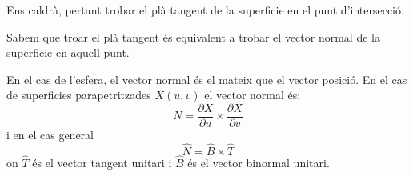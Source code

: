 \documentclass{article}
\begin{document}
Ens caldrà, pertant trobar el plà tangent de la superficie en el punt d'intersecció.


Sabem que troar el plà tangent és equivalent a trobar el vector normal de la superficie en aquell punt.


En el cas de l'esfera, el vector normal és el mateix que el vector posició. 
En el cas de superficies parapetritzades $X(u,v)$ el vector normal és:
 \begin{equation*}
    N= \frac{\partial X}{\partial u} \times \frac{\partial X}{\partial v}
\end{equation*}
i en el cas general 
\begin{equation*}
   \hat{N}= \hat{B}\times \hat{T}
\end{equation*}
on $\hat{T}$ és el vector tangent unitari i $\hat{B}$ és el vector binormal unitari.
\begin{figure}[h]
\centering
\begin{tikzpicture}[x=0.75pt,y=0.75pt,yscale=-1.1,xscale=1.1]


\end{tikzpicture}
\end{figure}
\end{document}
